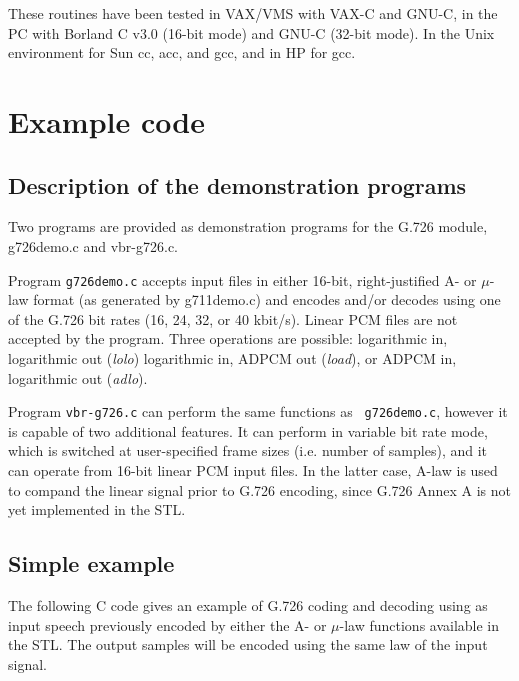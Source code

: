 These routines have been tested in VAX/VMS with VAX-C and GNU-C, in the PC
with  Borland C v3.0 (16-bit mode) and GNU-C (32-bit mode). In the Unix
environment for Sun cc, acc, and gcc, and in HP for gcc.


\section{Example code}

\subsection {Description of the demonstration programs}

Two programs are provided as demonstration programs for the G.726 module,
g726demo.c and vbr-g726.c.

Program {\tt g726demo.c} accepts input files in either 16-bit,
right-justified A- or $\mu$-law format (as generated by g711demo.c)
and encodes and/or decodes using one of the G.726 bit rates (16, 24,
32, or 40 kbit/s). Linear PCM files are not accepted by the
program. Three operations are possible: logarithmic in, logarithmic
out ({\em lolo}) logarithmic in, ADPCM out ({\em load}), or ADPCM in,
logarithmic out ({\em adlo}).

Program {\tt vbr-g726.c} can perform the same functions as {\tt
g726demo.c}, however it is capable of two additional features. It can
perform in variable bit rate mode, which is switched at user-specified
frame sizes (i.e. number of samples), and it can operate from 16-bit
linear PCM input files. In the latter case, A-law is used to compand
the linear signal prior to G.726 encoding, since G.726 Annex A
\cite{G.726:LinearIO} is not yet implemented in the STL.

\subsection {Simple example}

The following C code gives an example of G.726 coding and decoding
using  as input speech previously encoded by either the A- or
$\mu$-law functions available in the STL. The output samples will be
encoded using the same law of the input signal.

